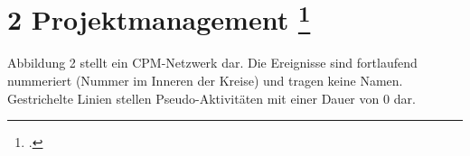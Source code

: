 \documentclass{lehramt-informatik-aufgabe}
\begin{document}

\section{2 Projektmanagement
\footcite[Thema 2 Teilaufgabe 2 Aufgabe 2]{examen:66116:2012:09}
}

Abbildung 2 stellt ein CPM-Netzwerk dar. Die Ereignisse sind fortlaufend
nummeriert (Nummer im Inneren der Kreise) und tragen keine Namen.
Gestrichelte Linien stellen Pseudo-Aktivitäten mit einer Dauer von 0
dar.

\begin{center}
\end{center}
\end{document}
